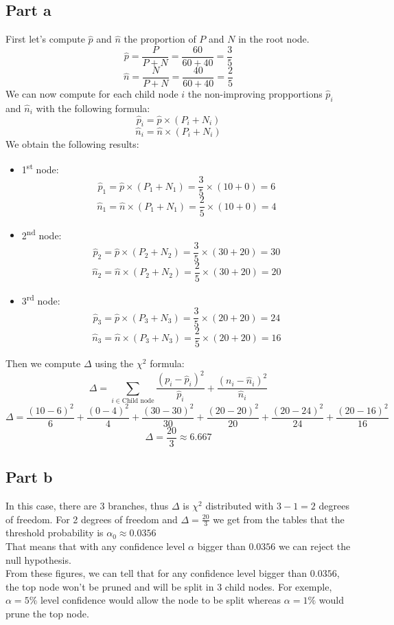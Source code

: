 \documentclass[a4paper, 10pt]{article}
\begin{document}
\subsection{Part a}
First let's compute $\hat{p}$ and $ \hat{n}$ the proportion of $P$ and $N$ in the root node.
$$
\hat{p} = \frac{P}{P+N} = \frac{60}{60+40} = \frac{3}{5}
$$
$$
\hat{n} = \frac{N}{P+N} = \frac{40}{60+40} = \frac{2}{5}
$$
We can now compute for each child node $i$ the non-improving propportions $\hat{p}_i$ and $\hat{n}_i$
with the following formula:
$$
\hat{p}_i = \hat{p} \times (P_i + N_i)
$$
$$
\hat{n}_i = \hat{n} \times (P_i + N_i)
$$
We obtain the following results:
\begin{itemize}
    \item 1\textsuperscript{st} node:
    $$
    \hat{p}_1 = \hat{p} \times (P_1 + N_1) = \frac{3}{5}\times(10 +0) = 6
    $$
    $$
    \hat{n}_1 = \hat{n} \times (P_1 + N_1) = \frac{2}{5}\times(10 +0) = 4
    $$

    \item 2\textsuperscript{nd} node:
    $$
    \hat{p}_2 = \hat{p} \times (P_2 + N_2) = \frac{3}{5}\times(30 + 20) = 30
    $$
    $$
    \hat{n}_2 = \hat{n} \times (P_2 + N_2) = \frac{2}{5}\times(30 + 20) = 20
    $$

    \item 3\textsuperscript{rd} node:
    $$
    \hat{p}_3 = \hat{p} \times (P_3 + N_3) = \frac{3}{5}\times(20 +20) = 24
    $$
    $$
    \hat{n}_3 = \hat{n} \times (P_3 + N_3) = \frac{2}{5}\times(20 +20) = 16
    $$
\end{itemize}
Then we compute $\Delta$ using the $\chi^2$ formula:
$$
\Delta = \sum_{i\in\text{Child node}} \frac{(p_i-\hat{p}_i)^2}{\hat{p}_i} + \frac{(n_i-\hat{n}_i)^2}{\hat{n}_i}
$$
$$
\Delta = \frac{(10-6)^2}{6}+\frac{(0-4)^2}{4}+\frac{(30-30)^2}{30}+\frac{(20-20)^2}{20}+\frac{(20-24)^2}{24}+\frac{(20-16)^2}{16}
$$
$$
\Delta = \frac{20}{3} \approx 6.667
$$

\subsection{Part b}
In this case, there are 3 branches, thus $\Delta$ is $\chi^2$ distributed with
$3-1=2$ degrees of freedom. For 2 degrees of freedom and $\Delta=\frac{20}{3}$ we get from the tables that the
threshold probability is $\alpha_{0}\approx0.0356$
\\
That means that with any confidence level $\alpha$ bigger than $0.0356$ we can reject the null
hypothesis.
\\
From these figures, we can tell that for any confidence level bigger than $0.0356$, the top node won't
be pruned and will be split in 3 child nodes. For exemple, $\alpha=5\%$ level confidence would allow
the node to be split whereas $\alpha=1\%$ would prune the top node. 
\end{document}
